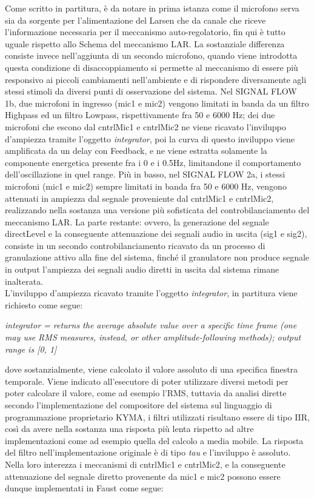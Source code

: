 Come scritto in partitura, è da notare in prima istanza
come il microfono serva sia da sorgente per l'alimentazione del Larsen che
da canale che riceve l'informazione necessaria per il meccanismo auto-regolatorio,
fin qui è tutto uguale rispetto allo Schema del meccanismo LAR.
La sostanziale differenza consiste invece nell'aggiunta di un secondo microfono,
quando viene introdotta questa condizione di disaccoppiamento si 
permette al meccanismo di essere più responsivo ai piccoli cambiamenti nell'ambiente
e di rispondere diversamente agli stessi stimoli da diversi punti di osservazione del sistema.
Nel SIGNAL FLOW 1b, due microfoni in ingresso (mic1 e mic2) 
vengono limitati in banda da un filtro Highpass ed 
un filtro Lowpass, rispettivamente fra 50 e 6000 Hz; dei due microfoni che escono 
dal cntrlMic1 e cntrlMic2 ne viene ricavato l'inviluppo d'ampiezza tramite
l'oggetto \textit{integrator}, poi la curva di questo inviluppo viene amplificata da 
un delay con Feedback, e ne viene estratta solamente la componente energetica 
presente fra i 0 e i 0.5Hz, limitandone il comportamento dell'oscillazione in quel range.
Più in basso, nel SIGNAL FLOW 2a, i stessi microfoni (mic1 e mic2) sempre
limitati in banda fra 50 e 6000 Hz, vengono attenuati in ampiezza dal segnale
proveniente dal cntrlMic1 e cntrlMic2, realizzando nella sostanza una 
versione più sofisticata del controbilanciamento del meccanismo LAR.
La parte restante: ovvero, la generazione del segnale directLevel e la 
conseguente attenuazione dei segnali audio in uscita (sig1 e sig2),
consiste in un secondo controbilanciamento ricavato da un processo di granulazione
attivo alla fine del sistema, finché il granulatore non produce segnale in output 
l'ampiezza dei segnali audio diretti in uscita dal sistema rimane inalterata. \\
L'inviluppo d'ampiezza ricavato tramite l'oggetto \textit{integrator}, in partitura 
viene richiesto come segue:

\begin{center}
    \vspace{0.5cm}
    \textit{integrator = returns the average absolute value over a specific 
    time frame (one may use RMS measures, instead, or other amplitude-following methods); 
    output range is [0, 1]}
    \vspace{0.5cm}
\end{center}

dove sostanzialmente, viene calcolato il valore assoluto di una specifica finestra temporale. 
Viene indicato all'esecutore di poter utilizzare diversi metodi per poter calcolare il valore, come ad esempio l'RMS, 
tuttavia da analisi dirette secondo l'implementazione del compositore del sistema sul 
linguaggio di programmazione proprietario KYMA, i filtri utilizzati risultano essere di tipo IIR,
così da avere nella sostanza una risposta più lenta rispetto ad altre implementazioni come ad esempio 
quella del calcolo a media mobile.  
La risposta del filtro nell'implementazione originale è di tipo \textit{tau} 
e l'inviluppo è assoluto. \\
Nella loro interezza i meccanismi di cntrlMic1 e cntrlMic2, e la conseguente
attenuazione del segnale diretto provenente da mic1 e mic2 
possono essere dunque implementati in Faust come segue:
\clearpage 

